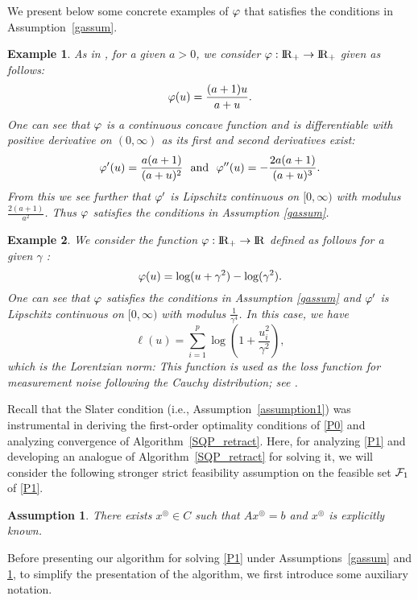 \documentclass[10pt]{article}
\numberwithin{equation}{section}
\newtheorem{example}{Example}[section]
\newtheorem{assumption}{Assumption}[section]
\def\R{{\rm I\!R}}
\def\xfeasss{x^\circledcirc}
\begin{document}
We present below some concrete examples of ${\color{black} \varphi}$ that satisfies the conditions in Assumption~\ref{gassum}.
\begin{example}
As in \cite{AhPX17}, for a given $a > 0$, we consider ${\color{black} \varphi}:\R_+\rightarrow \R_+$ given as follows:
\[
{\color{black} \varphi}(u) = \frac{(a + 1)u}{a + u}.
\]
One can see that ${\color{black} \varphi}$ is a continuous concave function and is differentiable with positive derivative on $(0, \infty)$ as its first and second derivatives exist:
\[
{\color{black} \varphi}'(u) = \frac{a(a+1)}{(a+u)^2}\ \text{ and }\  {\color{black} \varphi}''(u) = -\frac{2a(a+1)}{(a+u)^3}.
\]
From this we see further that ${\color{black} \varphi}'$ is Lipschitz continuous on $[0,\infty)$ with modulus $\frac{2(a+1)}{a^2}$. Thus ${\color{black} \varphi}$ satisfies the conditions in Assumption \ref{gassum}.
\end{example}

\begin{example}\label{Loren}
We consider the function ${\color{black} \varphi}:\R_+\to \R$ defined as follows for a given $\gamma$ \cite{CaWB08}:
\begin{equation*}
{\color{black} \varphi}(u) = \log(u + \gamma^2) - \log(\gamma^2).
\end{equation*}
One can see that ${\color{black} \varphi}$ satisfies the conditions in Assumption \ref{gassum} and ${\color{black} \varphi}'$ is Lipschitz continuous on $[0,\infty)$ with modulus $\frac{1}{\gamma^4}$. In this case, we have
\[
\ell(u) = \sum_{i=1}^p \log\left(1 + \frac{u_i^2}{\gamma^2}\right),
\]
which is the Lorentzian norm: This function is used as the loss function for measurement noise following the Cauchy distribution; see \cite{CaBA10,CaRA16}.
\end{example}
Recall that the Slater condition (i.e., Assumption~\ref{assumption1}) was instrumental in deriving the first-order optimality conditions of \eqref{P0} and analyzing convergence of Algorithm~\ref{SQP_retract}.
Here, for analyzing \eqref{P1} and developing an analogue of Algorithm~\ref{SQP_retract} for solving it, we will consider the following stronger strict feasibility assumption on the feasible set ${\cal F}_1$ of \eqref{P1}.
\begin{assumption}\label{assumption4}
{\color{black} There exists $\xfeasss\in C$ such that $A\xfeasss = b$ and $\xfeasss$ is explicitly known.}
\end{assumption}

Before presenting our algorithm for solving \eqref{P1} under Assumptions~\ref{gassum} and \ref{assumption4}, to simplify the presentation of the algorithm, we first introduce some auxiliary notation.
\end{document}
